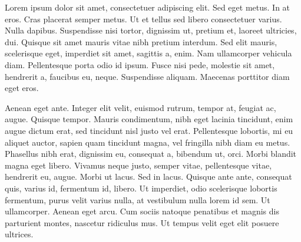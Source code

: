 \documentclass[a4paper,draft]{article}
\begin{document}
Lorem ipsum dolor sit amet, consectetuer adipiscing elit.
Sed eget metus. In at eros. Cras placerat semper metus.
Ut et tellus sed libero consectetuer varius. Nulla dapibus.
Suspendisse nisi tortor, dignissim ut, pretium et, laoreet
ultricies, dui. Quisque sit amet mauris vitae nibh pretium
interdum. Sed elit mauris, scelerisque eget, imperdiet sit
amet, sagittis a, enim. Nam ullamcorper vehicula diam.
Pellentesque porta odio id ipsum. Fusce nisi pede, molestie
sit amet, hendrerit a, faucibus eu, neque. Suspendisse
aliquam. \cite{viktorov-metodoj}
Maecenas porttitor diam eget eros. 

Aenean eget ante. Integer elit velit, euismod rutrum, tempor
at, feugiat ac, augue. Quisque tempor. Mauris condimentum,
nibh eget lacinia tincidunt, enim augue dictum erat, sed
tincidunt nisl justo vel erat. Pellentesque lobortis, mi eu
aliquet auctor, sapien quam tincidunt magna, vel fringilla
nibh diam eu metus. Phasellus nibh erat, dignissim eu,
consequat a, bibendum ut, orci. Morbi blandit magna eget
libero. \cite{ruckenstein-diffusion} Vivamus neque justo, semper vitae, pellentesque
vitae, hendrerit eu, augue. Morbi ut lacus. Sed in lacus.
Quisque ante ante, consequat quis, varius id, fermentum id,
libero. Ut imperdiet, odio scelerisque lobortis fermentum,
purus velit varius nulla, at vestibulum nulla lorem id sem.
Ut ullamcorper. Aenean eget arcu. Cum sociis natoque penatibus
et magnis dis parturient montes, nascetur ridiculus mus.
Ut tempus velit eget elit posuere ultrices. \cite{viktorov-metodoj} 


\end{document}

